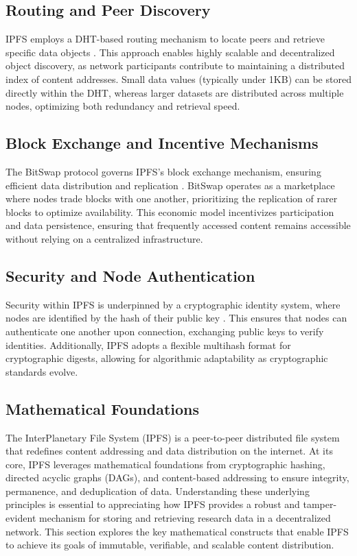 \documentclass[final]{rc-book-2.14}
\begin{document}
\subsection{Routing and Peer Discovery}

IPFS employs a DHT-based routing mechanism to locate peers and retrieve specific data objects \cite{benet2014ipfs}. This approach enables highly scalable and decentralized object discovery, as network participants contribute to maintaining a distributed index of content addresses. Small data values (typically under 1KB) can be stored directly within the DHT, whereas larger datasets are distributed across multiple nodes, optimizing both redundancy and retrieval speed.

\subsection{Block Exchange and Incentive Mechanisms}

The BitSwap protocol governs IPFS’s block exchange mechanism, ensuring efficient data distribution and replication \cite{benet2014ipfs}. BitSwap operates as a marketplace where nodes trade blocks with one another, prioritizing the replication of rarer blocks to optimize availability. This economic model incentivizes participation and data persistence, ensuring that frequently accessed content remains accessible without relying on a centralized infrastructure.

\subsection{Security and Node Authentication}

Security within IPFS is underpinned by a cryptographic identity system, where nodes are identified by the hash of their public key \cite{benet2014ipfs}. This ensures that nodes can authenticate one another upon connection, exchanging public keys to verify identities. Additionally, IPFS adopts a flexible multihash format for cryptographic digests, allowing for algorithmic adaptability as cryptographic standards evolve.

\subsection{Mathematical Foundations}

The InterPlanetary File System (IPFS) is a peer-to-peer distributed file system that redefines content addressing and data distribution on the internet. At its core, IPFS leverages mathematical foundations from cryptographic hashing, directed acyclic graphs (DAGs), and content-based addressing to ensure integrity, permanence, and deduplication of data. Understanding these underlying principles is essential to appreciating how IPFS provides a robust and tamper-evident mechanism for storing and retrieving research data in a decentralized network. This section explores the key mathematical constructs that enable IPFS to achieve its goals of immutable, verifiable, and scalable content distribution.
\end{document}
